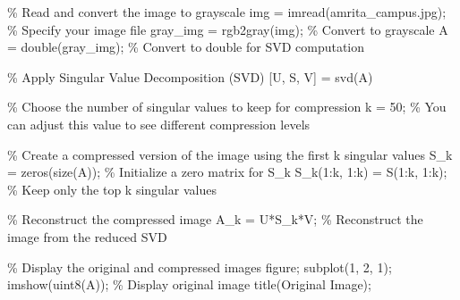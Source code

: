 \documentclass[
  journal,
]{IEEEtran}%
\newenvironment{Shaded}{\begin{snugshade}}{\end{snugshade}}
\newcommand{\CommentTok}[1]{\textcolor[rgb]{0.37,0.37,0.37}{#1}}
\newcommand{\FloatTok}[1]{\textcolor[rgb]{0.68,0.00,0.00}{#1}}
\newcommand{\NormalTok}[1]{\textcolor[rgb]{0.00,0.23,0.31}{#1}}
\newcommand{\OperatorTok}[1]{\textcolor[rgb]{0.37,0.37,0.37}{#1}}
\newcommand{\SpecialStringTok}[1]{\textcolor[rgb]{0.13,0.47,0.30}{#1}}
\newcommand{\VariableTok}[1]{\textcolor[rgb]{0.07,0.07,0.07}{#1}}
\begin{document}
\begin{Shaded}
\begin{Highlighting}[]

\CommentTok{\% Read and convert the image to grayscale}
\VariableTok{img} \OperatorTok{=} \VariableTok{imread}\NormalTok{(}\SpecialStringTok{\textquotesingle{}amrita\_campus.jpg\textquotesingle{}}\NormalTok{)}\OperatorTok{;} \CommentTok{\% Specify your image file}
\VariableTok{gray\_img} \OperatorTok{=} \VariableTok{rgb2gray}\NormalTok{(}\VariableTok{img}\NormalTok{)}\OperatorTok{;} \CommentTok{\% Convert to grayscale}
\VariableTok{A} \OperatorTok{=} \VariableTok{double}\NormalTok{(}\VariableTok{gray\_img}\NormalTok{)}\OperatorTok{;} \CommentTok{\% Convert to double for SVD computation}

\CommentTok{\% Apply Singular Value Decomposition (SVD)}
\NormalTok{[}\VariableTok{U}\OperatorTok{,} \VariableTok{S}\OperatorTok{,} \VariableTok{V}\NormalTok{] }\OperatorTok{=} \VariableTok{svd}\NormalTok{(}\VariableTok{A}\NormalTok{)}

\CommentTok{\% Choose the number of singular values to keep for compression}
\VariableTok{k} \OperatorTok{=} \FloatTok{50}\OperatorTok{;} \CommentTok{\% You can adjust this value to see different compression levels}

\CommentTok{\% Create a compressed version of the image using the first k singular values}
\VariableTok{S\_k} \OperatorTok{=} \VariableTok{zeros}\NormalTok{(}\VariableTok{size}\NormalTok{(}\VariableTok{A}\NormalTok{))}\OperatorTok{;} \CommentTok{\% Initialize a zero matrix for S\_k}
\VariableTok{S\_k}\NormalTok{(}\FloatTok{1}\OperatorTok{:}\VariableTok{k}\OperatorTok{,} \FloatTok{1}\OperatorTok{:}\VariableTok{k}\NormalTok{) }\OperatorTok{=} \VariableTok{S}\NormalTok{(}\FloatTok{1}\OperatorTok{:}\VariableTok{k}\OperatorTok{,} \FloatTok{1}\OperatorTok{:}\VariableTok{k}\NormalTok{)}\OperatorTok{;} \CommentTok{\% Keep only the top k singular values}

\CommentTok{\% Reconstruct the compressed image}
\VariableTok{A\_k} \OperatorTok{=} \VariableTok{U}\OperatorTok{*}\VariableTok{S\_k}\OperatorTok{*}\VariableTok{V}\OperatorTok{\textquotesingle{};} \CommentTok{\% Reconstruct the image from the reduced SVD}

\CommentTok{\% Display the original and compressed images}
\VariableTok{figure}\OperatorTok{;}
\VariableTok{subplot}\NormalTok{(}\FloatTok{1}\OperatorTok{,} \FloatTok{2}\OperatorTok{,} \FloatTok{1}\NormalTok{)}\OperatorTok{;}
\VariableTok{imshow}\NormalTok{(}\VariableTok{uint8}\NormalTok{(}\VariableTok{A}\NormalTok{))}\OperatorTok{;} \CommentTok{\% Display original image}
\VariableTok{title}\NormalTok{(}\SpecialStringTok{\textquotesingle{}Original Image\textquotesingle{}}\NormalTok{)}\OperatorTok{;}


\end{Highlighting}
\end{Shaded}
\end{document}
